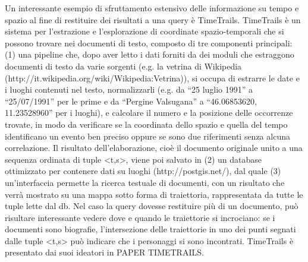 \documentclass[sigproc-sp.tex]{subfiles}
\begin{document}
Un interessante esempio di sfruttamento estensivo delle informazione su tempo e spazio al fine di restituire dei risultati a una query è TimeTrails. TimeTrails è un sistema per l’estrazione e l’esplorazione di coordinate spazio-temporali che si possono trovare nei documenti di testo, composto di tre componenti principali: (1) una pipeline che, dopo aver letto i dati forniti da dei moduli che estraggono documenti di testo da varie sorgenti (e.g. la vetrina di Wikipedia (http://it.wikipedia.org/wiki/Wikipedia:Vetrina)), si occupa di estrarre le date e i luoghi contenuti nel testo, normalizzarli (e.g. da “25 luglio 1991” a “25/07/1991” per le prime e da “Pergine Valsugana” a “46.06853620, 11.23528960” per i luoghi), e calcolare il numero e la posizione delle occorrenze trovate, in modo da verificare se la coordinata dello spazio e quella del tempo identificano un evento ben preciso oppure se sono due riferimenti senza alcuna correlazione. Il risultato dell’elaborazione, cioè il documento originale unito a una sequenza ordinata di tuple <t,s>, viene poi salvato in (2) un database ottimizzato per contenere dati su luoghi (http://postgis.net/), dal quale (3) un’interfaccia permette la ricerca testuale di documenti, con un risultato che verrà mostrato su una mappa sotto forma di traiettoria, rappresentata da tutte le tuple lette dal db. Nel caso la query dovesse restituire più di un documento, può risultare interessante vedere dove e quando le traiettorie si incrociano: se i documenti sono biografie, l’intersezione delle traiettorie in uno dei punti segnati dalle tuple <t,s> può indicare che i personaggi si sono incontrati.
TimeTrails è presentato dai suoi ideatori in PAPER TIMETRAILS.
\end{document}
